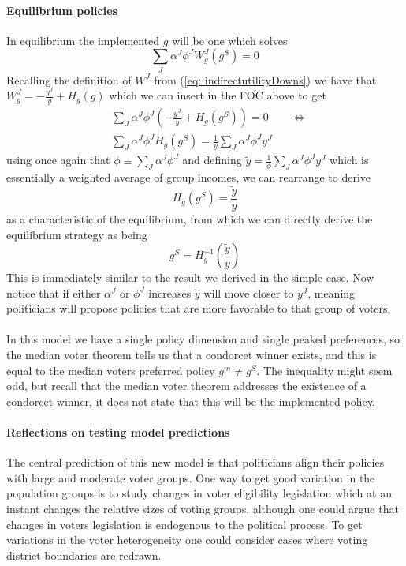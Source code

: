 \paragraph{Equilibrium policies} In equilibrium the implemented $g$ will be one which solves 
\begin{equation}
    \sum_J \alpha^J \phi^J W_g^J(g^S) = 0
\end{equation}
Recalling the definition of $W^J$ from (\ref{eq: indirectutilityDowns}) we have that $W^J_g = -\frac{y^J}{y} + H_g(g)$ which we can insert in the FOC above to get
\begin{equation}
    \begin{split}
    &\sum_J \alpha^J \phi^J \left(
        -\frac{y^J}{y} + H_g(g^S)
    \right) = 0 \qquad \Leftrightarrow
    \\ 
    & \sum_J \alpha^J \phi^J H_g(g^S) = \frac{1}{y} \sum_J \alpha^J \phi^J y^J
    \end{split}
\end{equation}
using once again that $\phi\equiv \sum_J \alpha^J \phi^J$ and defining $\tilde{y} = \frac{1}{\phi}\sum_J \alpha^J \phi^J y^J$ which is essentially a weighted average of group incomes, we can rearrange to derive 
\begin{equation}
    H_g(g^S) = \frac{\tilde{y}}{y}
\end{equation}
as a characteristic of the equilibrium, from which we can directly derive the equilibrium strategy as being 
\begin{equation}
    g^S = H_g^{-1}(\frac{\tilde{y}}{y})
\end{equation}
This is immediately similar to the result we derived in the simple case. Now notice that if either $\alpha^J$ or $\phi^J$ increases $\tilde{y}$ will move closer to $y^J$, meaning politicians will propose policies that are more favorable to that group of voters. 
\\ \\ 
In this model we have a single policy dimension and single peaked preferences, so the median voter theorem tells us that a condorcet winner exists, and this is equal to the median voters preferred policy $g^m \neq g^S$. The inequality might seem odd, but recall that the median voter theorem addresses the existence of a condorcet winner, it does not state that this will be the implemented policy. 

\paragraph{Reflections on testing model predictions} The central prediction of this new model is that politicians align their policies with large and moderate voter groups. One way to get good variation in the population groups is to study changes in voter eligibility legislation which at an instant changes the relative sizes of voting groups, although one could argue that changes in voters legislation is endogenous to the political process. To get variations in the voter heterogeneity one could consider cases where voting district boundaries are redrawn.

